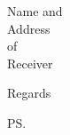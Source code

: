 \documentclass[a4paper,12pt]{letter}
\begin{document}
\begin{letter}{Name and \\ Address \\ of \\ Receiver}

\opening{} %



\closing{Regards} %

\cc{} %
\encl{} %
\ps{} %

\end{letter}
\end{document}
